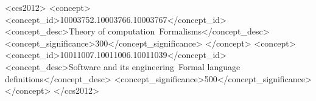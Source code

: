 \documentclass[acmsmall]{acmart}
\begin{document}
  
  
  
\begin{CCSXML}
  <ccs2012>  
  <concept>  
   <concept_id>10003752.10003766.10003767</concept_id>  
   <concept_desc>Theory of computation~Formalisms</concept_desc>  
   <concept_significance>300</concept_significance>  
   </concept>  
  <concept>  
   <concept_id>10011007.10011006.10011039</concept_id>  
   <concept_desc>Software and its engineering~Formal language definitions</concept_desc>  
   <concept_significance>500</concept_significance>  
   </concept>  
 </ccs2012>
\end{CCSXML}


\end{document}
